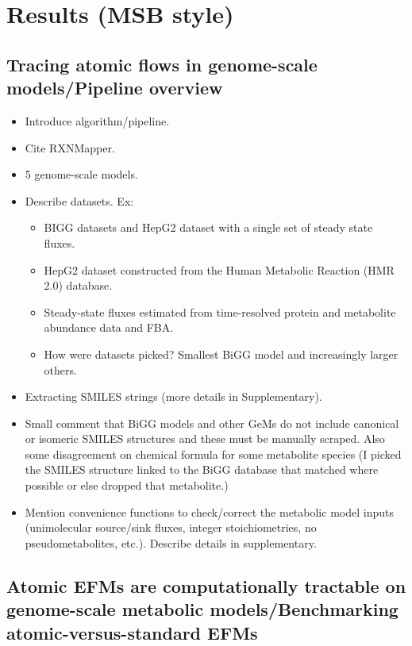 \documentclass[11pt]{article}
\begin{document}
\section{Results (MSB style)}

\subsection{Tracing atomic flows in genome-scale models/Pipeline overview}

\begin{itemize}
    \item Introduce algorithm/pipeline.
    \item Cite RXNMapper.
    \item 5 genome-scale models.
    \item Describe datasets. Ex:
    \begin{itemize}
        \item BIGG datasets and HepG2 dataset with a single set of steady state fluxes.
        \item HepG2 dataset constructed from the Human Metabolic Reaction (HMR 2.0) database.
        \item Steady-state fluxes estimated from time-resolved protein and metabolite abundance data and FBA.
        \item How were datasets picked? Smallest BiGG model and increasingly larger others.
    \end{itemize}
    \item Extracting SMILES strings (more details in Supplementary).
    \item Small comment that BiGG models and other GeMs do not include canonical or isomeric SMILES structures and these must be manually scraped. Also some disagreement on chemical formula for some metabolite species (I picked the SMILES structure linked to the BiGG database that matched where possible or else dropped that metabolite.)
    \item Mention convenience functions to check/correct the metabolic model inputs (unimolecular source/sink fluxes, integer stoichiometries, no pseudometabolites, etc.). Describe details in supplementary.
\end{itemize}

\subsection{Atomic EFMs are computationally tractable on genome-scale metabolic models/Benchmarking atomic-versus-standard EFMs}
\end{document}

